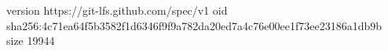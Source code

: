 version https://git-lfs.github.com/spec/v1
oid sha256:4c71ea64f5b3582f1d6346f9f9a782da20ed7a4c76e00ee1f73ee23186a1db9b
size 19944
